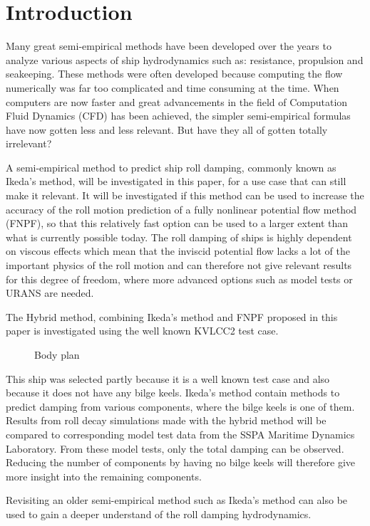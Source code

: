 \section{Introduction}\label{introduction}

Many great semi-empirical methods have been developed over the years to
analyze various aspects of ship hydrodynamics such as: resistance,
propulsion and seakeeping. These methods were often developed because
computing the flow numerically was far too complicated and time
consuming at the time. When computers are now faster and great
advancements in the field of Computation Fluid Dynamics (CFD) has been
achieved, the simpler semi-empirical formulas have now gotten less and
less relevant. But have they all of gotten totally irrelevant?

A semi-empirical method to predict ship roll damping, commonly known as
Ikeda's method, will be investigated in this paper, for a use case that
can still make it relevant. It will be investigated if this method can
be used to increase the accuracy of the roll motion prediction of a
fully nonlinear potential flow method (FNPF), so that this relatively
fast option can be used to a larger extent than what is currently
possible today. The roll damping of ships is highly dependent on viscous
effects which mean that the inviscid potential flow lacks a lot of the
important physics of the roll motion and can therefore not give relevant
results for this degree of freedom, where more advanced options such as
model tests or URANS are needed.

The Hybrid method, combining Ikeda's method and FNPF proposed in this
paper is investigated using the well known KVLCC2 test case.
 
            
    
    \begin{figure}
        \begin{center}\end{center}
        \caption{Body plan}
        \label{fig:body_plan}
    \end{figure}
    

    This ship was selected partly because it is a well known test case and
also because it does not have any bilge keels. Ikeda's method contain
methods to predict damping from various components, where the bilge
keels is one of them. Results from roll decay simulations made with the
hybrid method will be compared to corresponding model test data from the
SSPA Maritime Dynamics Laboratory. From these model tests, only the
total damping can be observed. Reducing the number of components by
having no bilge keels will therefore give more insight into the
remaining components.

Revisiting an older semi-empirical method such as Ikeda's method can
also be used to gain a deeper understand of the roll damping
hydrodynamics.

    